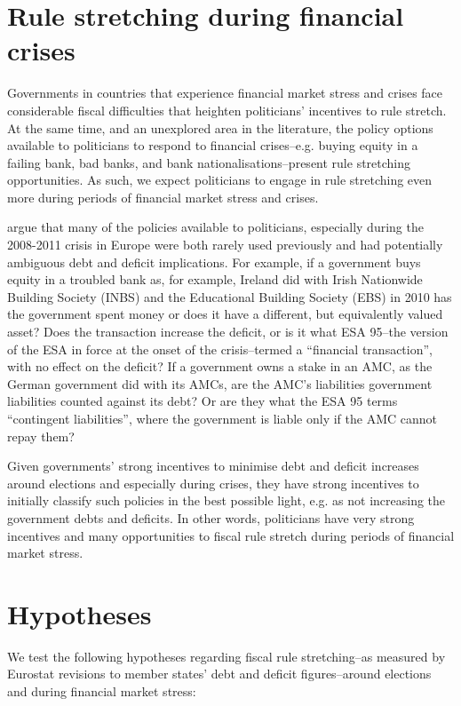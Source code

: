 \documentclass[]{article}
\begin{document}
\section{Rule stretching during financial crises}

Governments in countries that experience financial market stress and crises face considerable fiscal difficulties \cite[see][]{Laeven2012} that heighten politicians' incentives to rule stretch. At the same time, and an unexplored area in the literature, the policy options available to politicians to respond to financial crises--e.g. buying equity in a failing bank, bad banks, and bank nationalisations--present rule stretching opportunities. As such, we expect politicians to engage in rule stretching even more during periods of financial market stress and crises.

\cite{GandrudHallerberg2016} argue that many of the policies available to politicians, especially during the 2008-2011 crisis in Europe were both rarely used previously and had potentially ambiguous debt and deficit implications. For example, if a government buys equity in a troubled bank as, for example, Ireland did with Irish Nationwide Building Society (INBS) and the Educational Building Society (EBS) in 2010 has the government spent money or does it have a different, but equivalently valued asset? Does the transaction increase the deficit, or is it what ESA 95--the version of the ESA in force at the onset of the crisis--termed a ``financial transaction'', with no effect on the deficit? If a government owns a stake in an AMC, as the German government did with its AMCs, are the AMC's liabilities government liabilities counted against its debt? Or are they what the ESA 95 terms ``contingent liabilities'', where the government is liable only if the AMC cannot repay them?

Given governments' strong incentives to minimise debt and deficit increases around elections and especially during crises, they have strong incentives to initially classify such policies in the best possible light, e.g. as not increasing the government debts and deficits. In other words, politicians have very strong incentives and many opportunities to fiscal rule stretch during periods of financial market stress.

\section{Hypotheses}

We test the following hypotheses regarding fiscal rule stretching--as measured by Eurostat revisions to member states' debt and deficit figures--around elections and during financial market stress:
\end{document}
